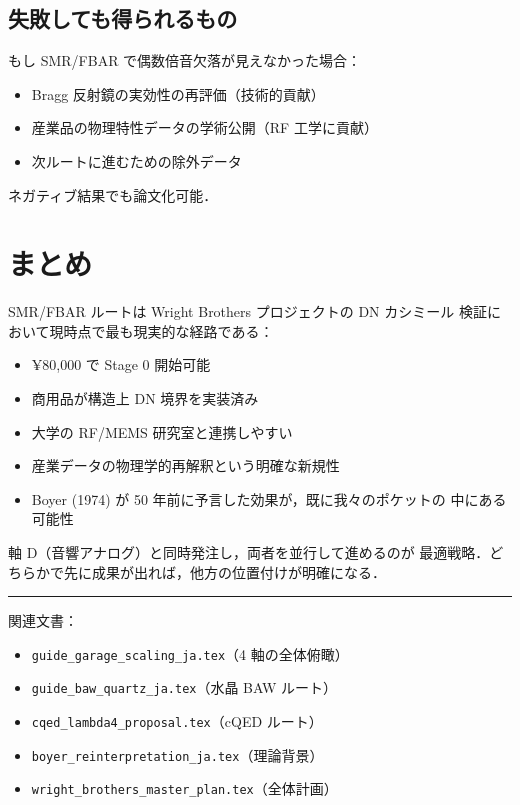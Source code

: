 \documentclass[11pt,a4paper]{article}
\begin{document}
\subsection{失敗しても得られるもの}

もし SMR/FBAR で偶数倍音欠落が見えなかった場合：
\begin{itemize}
\item Bragg 反射鏡の実効性の再評価（技術的貢献）
\item 産業品の物理特性データの学術公開（RF 工学に貢献）
\item 次ルートに進むための除外データ
\end{itemize}

ネガティブ結果でも論文化可能．

\section{まとめ}

SMR/FBAR ルートは Wright Brothers プロジェクトの DN カシミール
検証において現時点で最も現実的な経路である：

\begin{itemize}
\item ¥80,000 で Stage 0 開始可能
\item 商用品が構造上 DN 境界を実装済み
\item 大学の RF/MEMS 研究室と連携しやすい
\item 産業データの物理学的再解釈という明確な新規性
\item Boyer (1974) が 50 年前に予言した効果が，既に我々のポケットの
中にある可能性
\end{itemize}

軸 D（音響アナログ）と同時発注し，両者を並行して進めるのが
最適戦略．どちらかで先に成果が出れば，他方の位置付けが明確になる．

\vspace{1em}
\hrule
\vspace{0.5em}
\small
\noindent
関連文書：
\begin{itemize}
\item \texttt{guide\_garage\_scaling\_ja.tex}（4 軸の全体俯瞰）
\item \texttt{guide\_baw\_quartz\_ja.tex}（水晶 BAW ルート）
\item \texttt{cqed\_lambda4\_proposal.tex}（cQED ルート）
\item \texttt{boyer\_reinterpretation\_ja.tex}（理論背景）
\item \texttt{wright\_brothers\_master\_plan.tex}（全体計画）
\end{itemize}
\end{document}
